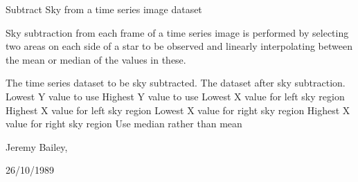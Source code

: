 \begin{manroutinedescription}
        Subtract Sky from a time series image dataset

        Sky subtraction from each frame of a time series image is
        performed by selecting two areas on each side of a star to
        be observed and linearly interpolating between the mean or
        median of the values in these.

\begin{manparametertable}
   The time %
series dataset to be sky subtracted.
   The %
dataset after sky subtraction.
   Lowest Y value to use
   Highest Y value to use
   Lowest X value for left sky %
region
   Highest X value for left sky %
region
   Lowest X value for right sky %
region
   Highest X value for right sky %
region
   Use median rather than mean

\end{manparametertable}
         Jeremy Bailey, {}

         26/10/1989

\end{manroutinedescription}
